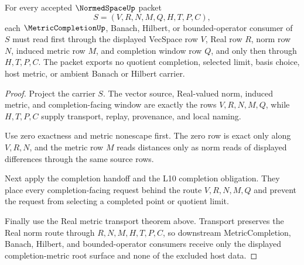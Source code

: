 \begin{theorem}
\label{thm:normedspace-completion-metric-root-unblock}
For every accepted $\NormedSpaceUp$ packet
$$
S=(V,R,N,M,Q,H,T,P,C),
$$
each $\MetricCompletionUp$, Banach, Hilbert, or bounded-operator consumer of $S$ must read first through the displayed VecSpace row $V$, Real row $R$, norm row $N$, induced metric row $M$, and completion window row $Q$, and only then through $H,T,P,C$. The packet exports no quotient completion, selected limit, basis choice, host metric, or ambient Banach or Hilbert carrier.
\end{theorem}
\begin{proof}
Project the carrier $S$. The vector source, Real-valued norm, induced metric, and completion-facing window are exactly the rows $V,R,N,M,Q$, while $H,T,P,C$ supply transport, replay, provenance, and local naming.

Use zero exactness and metric nonescape first. The zero row is exact only along $V,R,N$, and the metric row $M$ reads distances only as norm reads of displayed differences through the same source rows.

Next apply the completion handoff and the L10 completion obligation. They place every completion-facing request behind the route $V,R,N,M,Q$ and prevent the request from selecting a completed point or quotient limit.

Finally use the Real metric transport theorem above. Transport preserves the Real norm route through $R,N,M,H,T,P,C$, so downstream MetricCompletion, Banach, Hilbert, and bounded-operator consumers receive only the displayed completion-metric root surface and none of the excluded host data.
\end{proof}


